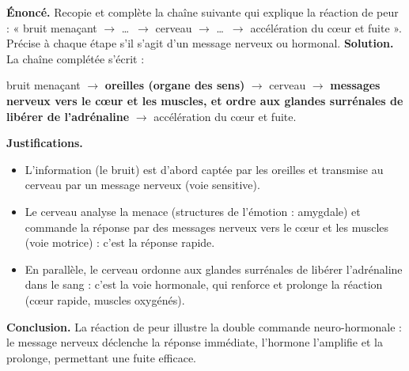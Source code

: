 \documentclass[11pt]{article}
\newcommand{\cle}[1]{{\popxbold\color{popdark}#1}}
\begin{document}
\begin{exoresolu}
\textbf{Énoncé.} Recopie et complète la chaîne suivante qui explique la réaction de peur : « bruit menaçant $\rightarrow$ \ldots\ $\rightarrow$ cerveau $\rightarrow$ \ldots\ $\rightarrow$ accélération du cœur et fuite ». Précise à chaque étape s'il s'agit d'un message nerveux ou hormonal.
\tcblower
\textbf{Solution.} La chaîne complétée s'écrit :
\begin{center}
bruit menaçant $\rightarrow$ \textbf{oreilles (organe des sens)} $\rightarrow$ cerveau $\rightarrow$ \textbf{messages nerveux vers le cœur et les muscles, et ordre aux glandes surrénales de libérer de l'adrénaline} $\rightarrow$ accélération du cœur et fuite.
\end{center}
\textbf{Justifications.}
\begin{itemize}
\item L'information (le bruit) est d'abord captée par les \cle{oreilles} et transmise au cerveau par un \cle{message nerveux} (voie sensitive).
\item Le cerveau analyse la menace (structures de l'émotion : amygdale) et commande la réponse par des \cle{messages nerveux} vers le cœur et les muscles (voie motrice) : c'est la réponse rapide.
\item En parallèle, le cerveau ordonne aux \cle{glandes surrénales} de libérer l'\cle{adrénaline} dans le sang : c'est la voie \cle{hormonale}, qui renforce et prolonge la réaction (cœur rapide, muscles oxygénés).
\end{itemize}
\textbf{Conclusion.} La réaction de peur illustre la double commande neuro-hormonale : le message nerveux déclenche la réponse immédiate, l'hormone l'amplifie et la prolonge, permettant une fuite efficace.
\end{exoresolu}
\end{document}
